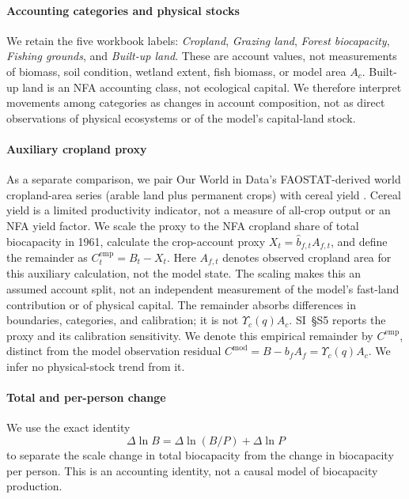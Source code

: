 \documentclass[preprint,12pt,authoryear]{elsarticle}
\newcommand{\Ups}{\Upsilon_c}
\begin{document}
\paragraph{Accounting categories and physical stocks} We retain the five workbook labels: \emph{Cropland}, \emph{Grazing land}, \emph{Forest biocapacity}, \emph{Fishing grounds}, and \emph{Built-up land}. These are account values, not measurements of biomass, soil condition, wetland extent, fish biomass, or model area $A_c$. Built-up land is an NFA accounting class, not ecological capital. We therefore interpret movements among categories as changes in account composition, not as direct observations of physical ecosystems or of the model's capital-land stock.

\paragraph{Auxiliary cropland proxy} As a separate comparison, we pair Our World in Data's FAOSTAT-derived world cropland-area series (arable land plus permanent crops) with cereal yield \citep{OWIDCropland2026,OWIDCereal2026}. Cereal yield is a limited productivity indicator, not a measure of all-crop output or an NFA yield factor. We scale the proxy to the NFA cropland share of total biocapacity in 1961, calculate the crop-account proxy $X_t=\hat b_{f,t}A_{f,t}$, and define the remainder as $C^{\mathrm{emp}}_t=B_t-X_t$. Here $A_{f,t}$ denotes observed cropland area for this auxiliary calculation, not the model state. The scaling makes this an assumed account split, not an independent measurement of the model's fast-land contribution or of physical capital. The remainder absorbs differences in boundaries, categories, and calibration; it is not $\Ups(q)A_c$. SI~\S S5 reports the proxy and its calibration sensitivity. We denote this empirical remainder by $C^{\mathrm{emp}}$, distinct from the model observation residual $C^{\mathrm{mod}}=B-b_fA_f=\Ups(q)A_c$. We infer no physical-stock trend from it.

\paragraph{Total and per-person change} We use the exact identity
\begin{equation*}
\Delta\ln B=\Delta\ln(B/P)+\Delta\ln P
\end{equation*}
to separate the scale change in total biocapacity from the change in biocapacity per person. This is an accounting identity, not a causal model of biocapacity production.
\end{document}
